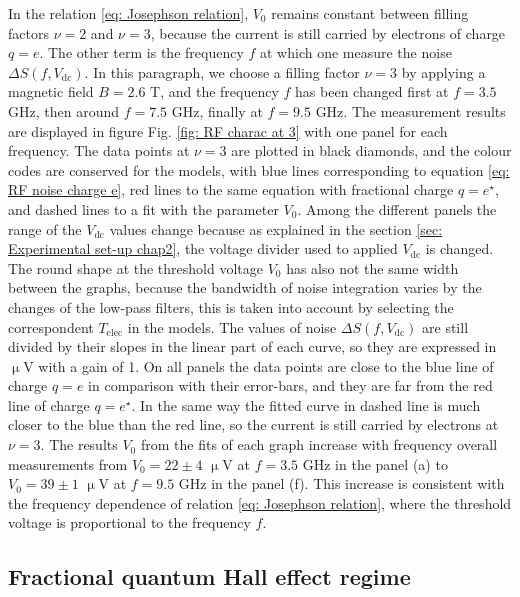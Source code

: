 In the relation \eqref{eq: Josephson relation}, $V_{0}$ remains constant between filling factors $\nu = 2$ and $\nu = 3$, because the current is still carried by electrons of charge $q = e$.
The other term is the frequency $f$ at which one measure the noise $\Delta S \left(f,V_{\mathrm{dc}}\right)$.
In this paragraph, we choose a filling factor $\nu = 3$ by applying a magnetic field $B = 2.6$ T, and the frequency $f$ has been changed first at $f = 3.5$ GHz, then around $f = 7.5$ GHz, finally at $f = 9.5$ GHz.
The measurement results are displayed in figure Fig. \ref{fig: RF charac at 3} with one panel for each frequency.
The data points at $\nu = 3$ are plotted in black diamonds, and the colour codes are conserved for the models, with blue lines corresponding to equation \eqref{eq: RF noise charge e}, red lines to the same equation with fractional charge $q = e^{\star}$, and dashed lines to a fit with the parameter $V_{0}$.
Among the different panels the range of the $V_{\mathrm{dc}}$ values change because as explained in the section \ref{sec: Experimental set-up chap2}, the voltage divider used to applied $V_{\mathrm{dc}}$ is changed.
The round shape at the threshold voltage $V_{0}$ has also not the same width between the graphs, because the bandwidth of noise integration varies by the changes of the low-pass filters, this is taken into account by selecting the correspondent $T_{\mathrm{elec}}$ in the models. 
The values of noise $\Delta S \left(f,V_{\mathrm{dc}}\right)$ are still divided by their slopes in the linear part of each curve, so they are expressed in $\upmu$V with a gain of 1.
On all panels the data points are close to the blue line of charge $q = e$ in comparison with their error-bars, and they are far from the red line of charge $q = e^{\star}$.
In the same way the fitted curve in dashed line is much closer to the blue than the red line, so the current is still carried by electrons at $\nu = 3$.
The results $V_{0}$ from the fits of each graph increase with frequency overall measurements from $V_{0} = 22 \pm 4$ $\upmu$V at $f = 3.5$ GHz in the panel (a) to $V_{0} = 39 \pm 1$ $\upmu$V at $f = 9.5$ GHz in the panel (f).
This increase is consistent with the frequency dependence of relation \eqref{eq: Josephson relation}, where the threshold voltage is proportional to the frequency $f$.

\subsection{Fractional quantum Hall effect regime}

